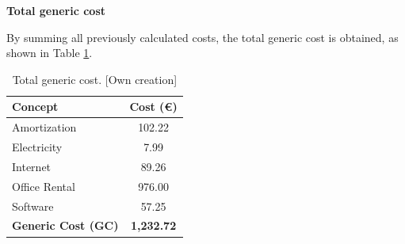 \textbf{Total generic cost}
\vspace{-5pt}

By summing all previously calculated costs, the total generic cost is obtained, as shown in Table \ref{tab:total-generic-cost}. 

\vspace{-10pt}

\begin{table}[H]
    \renewcommand{\arraystretch}{1}
    \centering
    \footnotesize
    \begin{tabular}{@{}l c@{}}
    \textbf{Concept} & \textbf{Cost (€)} \\ \hline
    Amortization & 102.22  \\
    Electricity & 7.99 \\
    Internet & 89.26 \\
    Office Rental & 976.00 \\
    Software & 57.25 \\
    \hline
    \textbf{Generic Cost (GC)} & \textbf{1,232.72} \\
    \end{tabular}
    \caption[Total generic cost]{Total generic cost. [Own creation]}
    \label{tab:total-generic-cost}
\end{table}

\vspace{-20pt}


